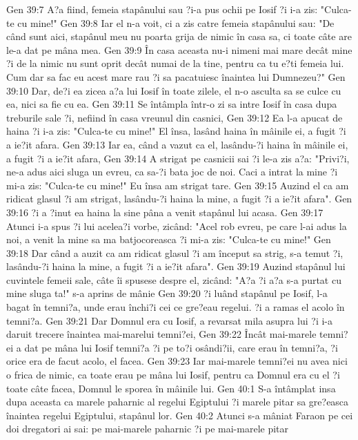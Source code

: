 Gen 39:7  A?a fiind, femeia stapânului sau ?i-a pus ochii pe Iosif ?i i-a zis: "Culca-te cu mine!"
Gen 39:8  Iar el n-a voit, ci a zis catre femeia stapânului sau: "De când sunt aici, stapânul meu nu poarta grija de nimic în casa sa, ci toate câte are le-a dat pe mâna mea.
Gen 39:9  În casa aceasta nu-i nimeni mai mare decât mine ?i de la nimic nu sunt oprit decât numai de la tine, pentru ca tu e?ti femeia lui. Cum dar sa fac eu acest mare rau ?i sa pacatuiesc înaintea lui Dumnezeu?"
Gen 39:10  Dar, de?i ea zicea a?a lui Iosif în toate zilele, el n-o asculta sa se culce cu ea, nici sa fie cu ea.
Gen 39:11  Se întâmpla într-o zi sa intre Iosif în casa dupa treburile sale ?i, nefiind în casa vreunul din casnici,
Gen 39:12  Ea l-a apucat de haina ?i i-a zis: "Culca-te cu mine!" El însa, lasând haina în mâinile ei, a fugit ?i a ie?it afara.
Gen 39:13  Iar ea, când a vazut ca el, lasându-?i haina în mâinile ei, a fugit ?i a ie?it afara,
Gen 39:14  A strigat pe casnicii sai ?i le-a zis a?a: "Privi?i, ne-a adus aici sluga un evreu, ca sa-?i bata joc de noi. Caci a intrat la mine ?i mi-a zis: "Culca-te cu mine!" Eu însa am strigat tare.
Gen 39:15  Auzind el ca am ridicat glasul ?i am strigat, lasându-?i haina la mine, a fugit ?i a ie?it afara".
Gen 39:16  ?i a ?inut ea haina la sine pâna a venit stapânul lui acasa.
Gen 39:17  Atunci i-a spus ?i lui acelea?i vorbe, zicând: "Acel rob evreu, pe care l-ai adus la noi, a venit la mine sa ma batjocoreasca ?i mi-a zis: "Culca-te cu mine!"
Gen 39:18  Dar când a auzit ca am ridicat glasul ?i am început sa strig, s-a temut ?i, lasându-?i haina la mine, a fugit ?i a ie?it afara".
Gen 39:19  Auzind stapânul lui cuvintele femeii sale, câte îi spusese despre el, zicând: "A?a ?i a?a s-a purtat cu mine sluga ta!" s-a aprins de mânie
Gen 39:20  ?i luând stapânul pe Iosif, l-a bagat în temni?a, unde erau închi?i cei ce gre?eau regelui. ?i a ramas el acolo în temni?a.
Gen 39:21  Dar Domnul era cu Iosif, a revarsat mila asupra lui ?i i-a daruit trecere înaintea mai-marelui temni?ei,
Gen 39:22  Încât mai-marele temni?ei a dat pe mâna lui Iosif temni?a ?i pe to?i osândi?ii, care erau în temni?a, ?i orice era de facut acolo, el facea.
Gen 39:23  Iar mai-marele temni?ei nu avea nici o frica de nimic, ca toate erau pe mâna lui Iosif, pentru ca Domnul era cu el ?i toate câte facea, Domnul le sporea în mâinile lui.
Gen 40:1  S-a întâmplat insa dupa aceasta ca marele paharnic al regelui Egiptului ?i marele pitar sa gre?easca înaintea regelui Egiptului, stapânul lor.
Gen 40:2  Atunci s-a mâniat Faraon pe cei doi dregatori ai sai: pe mai-marele paharnic ?i pe mai-marele pitar
